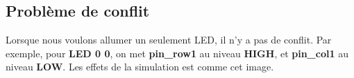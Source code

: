 \documentclass[14px]{article}
\begin{document}
\clearpage

\subsection{Problème de conflit}


\clearpage
Lorsque nous voulons allumer un seulement LED, il n'y a pas de conflit. Par exemple, pour \textbf{LED 0 0}, on met \textbf{pin\_row1} au niveau \textbf{HIGH}, et \textbf{pin\_col1} au niveau \textbf{LOW}. Les effets de la simulation est comme cet image.\\
\begin{figure}[htbp]
\end{figure}\\
\end{document}
